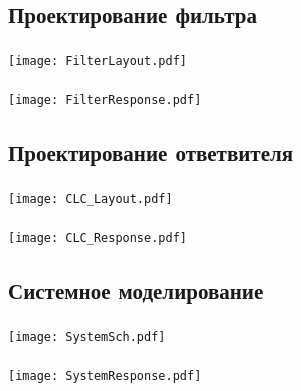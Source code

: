 \documentclass[c]{beamer}  %
\begin{document}
\subsection{Проектирование фильтра}

	\begin{frame}
		\frametitle{\insertsection}
		\framesubtitle{\insertsubsection}
		\centering
		\texttt{[image: FilterLayout.pdf]}
	\end{frame}

	\begin{frame}
		\frametitle{\insertsection}
		\framesubtitle{\insertsubsection}
		\centering
		\texttt{[image: FilterResponse.pdf]}
		
	\end{frame}

\subsection{Проектирование ответвителя}

	\begin{frame}
		\frametitle{\insertsection}
		\framesubtitle{\insertsubsection}
		\centering
		\texttt{[image: CLC\_Layout.pdf]}
	\end{frame}
	
	\begin{frame}
		\frametitle{\insertsection}
		\framesubtitle{\insertsubsection}
		\centering
		\texttt{[image: CLC\_Response.pdf]}
		
	\end{frame}

\subsection{Системное моделирование}

	\begin{frame}
		\frametitle{\insertsection}
		\framesubtitle{\insertsubsection}
		\centering
		\hspace*{-0.075\textwidth}%
		\texttt{[image: SystemSch.pdf]}
		
	\end{frame}
	
	\begin{frame}
		\frametitle{\insertsection}
		\framesubtitle{\insertsubsection}
		\centering
		\hspace*{-0.075\textwidth}%
		\texttt{[image: SystemResponse.pdf]}
		
	\end{frame}
\end{document}
